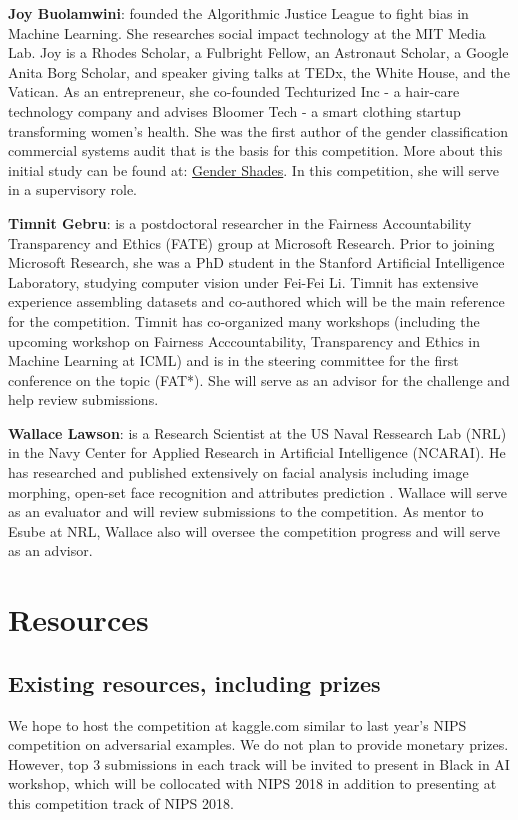 \documentclass[11pt, oneside]{article}
\makeatletter
\let\@internalcite\cite
\def\cite{\def\citeauthoryear##1##2{##1, ##2}\@internalcite}
\makeatother
\begin{document}
{\bf Joy Buolamwini}: founded the Algorithmic Justice League to 
fight bias in Machine Learning. She researches social impact technology at the 
MIT Media Lab. Joy is a Rhodes Scholar, a Fulbright Fellow, an Astronaut 
Scholar, a Google Anita Borg Scholar, and speaker giving talks at TEDx, the 
White House, and the Vatican. As an entrepreneur, she co-founded Techturized 
Inc - a hair-care technology company and advises Bloomer Tech - a smart 
clothing startup transforming women’s health. She was the first author of the 
gender classification commercial systems audit \cite{buolamwini2018gender} that 
is the basis for this competition. More about this initial study can be found 
at: \href{http://www.gendershades.org}{Gender Shades}. In this competition, she 
will serve in a supervisory role.

{\bf Timnit Gebru}: is a postdoctoral researcher in the Fairness Accountability 
Transparency and Ethics (FATE) group at Microsoft Research. Prior to joining 
Microsoft Research, she was a PhD student in the Stanford Artificial 
Intelligence Laboratory, studying computer vision under Fei-Fei Li. Timnit has 
extensive experience assembling datasets and co-authored 
\cite{buolamwini2018gender} which will be the main reference for the 
competition. Timnit has co-organized many workshops (including the upcoming 
workshop on Fairness Acccountability, Transparency and Ethics in Machine 
Learning at ICML) and is in the steering committee for the first conference on 
the topic (FAT*). She will serve as an advisor for the challenge and help 
review submissions.

{\bf Wallace Lawson}: is a Research Scientist at the US Naval Ressearch Lab
(NRL) in the Navy Center for Applied Research in Artificial Intelligence
(NCARAI).  He has researched and published extensively on facial analysis
including image morphing, open-set face recognition and attributes prediction 
\cite{kamgar2011toward}. Wallace will serve as an evaluator and will review 
submissions to the competition. As mentor to Esube at NRL, Wallace also will 
oversee the competition progress and will serve as an advisor.

\section{Resources}
\subsection{Existing resources, including prizes}

We hope to host the competition at kaggle.com similar to last year's NIPS
competition on adversarial examples. We do not plan to provide monetary prizes.
However, top 3 submissions in each track will be invited to present in Black in
AI workshop, which will be collocated with NIPS 2018 in addition to presenting 
at this competition track of NIPS 2018.



%

\end{document}
